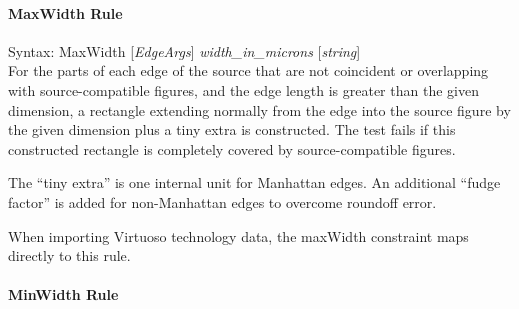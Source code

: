 \paragraph{{\et MaxWidth} Rule}

\begin{description}
\item{Syntax: {\vt MaxWidth} [{\it EdgeArgs\/}]
   {\it width\_in\_microns} [{\it string\/}] }\\

For the parts of each edge of the source that are not coincident or
overlapping with source-compatible figures, and the edge length is
greater than the given dimension, a rectangle extending normally from
the edge into the source figure by the given dimension plus a tiny
extra is constructed.  The test fails if this constructed rectangle is
completely covered by source-compatible figures.

The ``tiny extra'' is one internal unit for Manhattan edges.  An
additional ``fudge factor'' is added for non-Manhattan edges to
overcome roundoff error.

When importing Virtuoso technology data, the {\vt maxWidth} constraint
maps directly to this rule.
\end{description}

\paragraph{{\et MinWidth} Rule}

